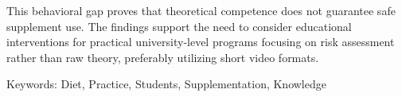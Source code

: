 This behavioral gap proves that theoretical competence does not guarantee safe supplement use. The findings support the need to consider educational interventions for practical university-level programs focusing on risk assessment rather than raw theory, preferably utilizing short video formats.

\bigskip

Keywords: Diet, Practice, Students, Supplementation, Knowledge

